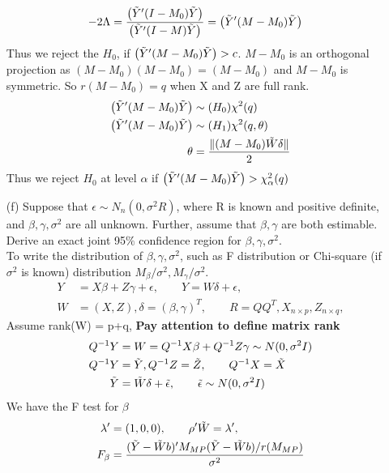 \documentclass{homework}
\begin{document}
\begin{itemize}
\begin{align*}
-2 \Lambda &= \frac{\left(\Tilde{Y}' (I- M_0) \Tilde{Y} \right)}{\left(\Tilde{Y}' (I- M) \Tilde{Y} \right)} = \left(\Tilde{Y}' (M -M_0) \Tilde{Y} \right)
\end{align*}
Thus we reject the $H_0$, if $\left(\Tilde{Y}' (M -M_0) \Tilde{Y} \right) > c$.
$M-M_0$ is an orthogonal projection as $(M-M_0)(M-M_0) = (M-M_0)$ and $M-M_0$ is symmetric. So $r(M-M_0) = q$ when X and Z are full rank.\\
\begin{align*}
\left(\Tilde{Y}' (M -M_0) \Tilde{Y} \right) &\sim (H_0) \chi^2(q)\\
\left(\Tilde{Y}' (M -M_0) \Tilde{Y} \right) &\sim (H_1) \chi^2(q, \theta)\\
\theta &= \frac{\lVert (M-M_0) \Tilde{W} \delta \rVert}{2}
\end{align*}
Thus we reject $H_0$ at level $\alpha$ if $\left(\Tilde{Y}' (M -M_0) \Tilde{Y} \right) > \chi^2_{\alpha}(q)$
\item[(f)] Suppose that $\epsilon \sim N_n(0, \sigma^2 R )$, where R is known and positive definite, and
$\beta, \gamma, \sigma^2$ are all unknown. Further, assume that $\beta, \gamma$ are both estimable. Derive an exact joint 95$\%$ confidence region for $\beta, \gamma, \sigma^2$.\\
To write the distribution of $\beta, \gamma, \sigma^2$, such as F distribution or Chi-square (if $\sigma^2$ is known) distribution $M_{\beta}/ \sigma^2, M_{\gamma}/ \sigma^2$.
\begin{align*}
Y &= X\beta + Z\gamma + \epsilon, \qquad Y = W\delta + \epsilon, \\
W &= (X, Z), \delta = (\beta, \gamma)^T, \qquad R = Q Q^{T}, X_{n \times p}, Z_{n \times q}, 
\end{align*}
Assume rank(W) = p+q, \textbf{Pay attention to define matrix rank}
\begin{align*}
Q^{-1}Y &= W = Q^{-1}X \beta + Q^{-1}Z \gamma \sim N(0, \sigma^2 I)\\
Q^{-1}Y &= \Tilde{Y}, Q^{-1}Z = \Tilde{Z}, \qquad Q^{-1}X = \Tilde{X}\\
\Tilde{Y} &= \Tilde{W} \delta + \Tilde{\epsilon},  \qquad \Tilde{\epsilon} \sim N(0,\sigma^2 I)
\end{align*}
We have the F test for $\beta$  
\begin{align*}
\lambda' &= (1,0,0), \qquad \rho'\Tilde{W} = \lambda', \\
F_{\beta} &= \frac{(\Tilde{Y}- \Tilde{W} b)'M_{MP} (\Tilde{Y}- \Tilde{W} b)/r(M_{MP})}{\sigma^2}\\

\end{align*}
\end{itemize}
\end{document}
